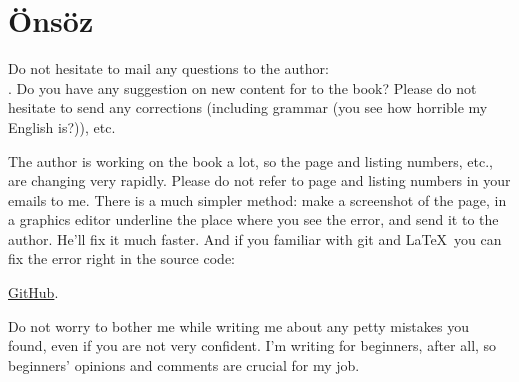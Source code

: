 \part*{Önsöz}


Do not hesitate to mail any questions to the author: \\
\GTT{\EMAILS}.
Do you have any suggestion on new content for to the book?
Please do not hesitate to send any corrections (including grammar (you see how horrible my English is?)), etc.

The author is working on the book a lot, so the page and listing numbers, etc., are changing very rapidly.
Please do not refer to page and listing numbers in your emails to me.
There is a much simpler method: make a screenshot of the page, in a graphics editor underline the place where you see the error,
and send it to the author. He'll fix it much faster.
And if you familiar with git and \LaTeX\, you can fix the error right in the source code: 

\href{http://go.yurichev.com/17089}{GitHub}.

Do not worry to bother me while writing me about any petty mistakes you found, even if you are not very confident.
I'm writing for beginners, after all, so beginners' opinions and comments are crucial for my job.
